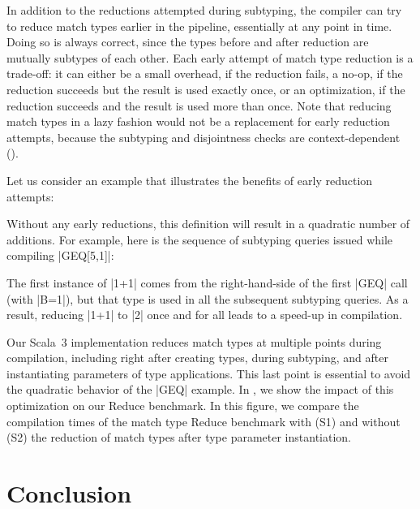 In addition to the reductions attempted during subtyping, the compiler can try to reduce match types earlier in the pipeline, essentially at any point in time.
Doing so is always correct, since the types before and after reduction are mutually subtypes of each other.
Each early attempt of match type reduction is a trade-off: it can either be a small overhead, if the reduction fails, a no-op, if the reduction succeeds but the result is used exactly once, or an optimization, if the reduction succeeds and the result is used more than once.
Note that reducing match types in a lazy fashion would not be a replacement for early reduction attempts, because the subtyping and disjointness checks are context-dependent ().

Let us consider an example that illustrates the benefits of early reduction attempts:

\geqDefinition

\noindent
Without any early reductions, this definition will result in a quadratic number of additions. For example, here is the sequence of subtyping queries issued while compiling |GEQ[5,1]|:

\geqExample

\noindent
The first instance of |1+1| comes from the right-hand-side of the first |GEQ| call (with |B=1|), but that type is used in all the subsequent subtyping queries. As a result, reducing |1+1| to |2| once and for all leads to a speed-up in compilation.

Our Scala~3 implementation reduces match types at multiple points during compilation, including right after creating types, during subtyping, and after instantiating parameters of type applications.
This last point is essential to avoid the quadratic behavior of the |GEQ| example.
In , we show the impact of this optimization on our Reduce benchmark.
In this figure, we compare the compilation times of the match type Reduce benchmark with (S1) and without (S2) the reduction of match types after type parameter instantiation.


\chapter{Conclusion}
\label{chap:conclusion}
\lipsum[1]

